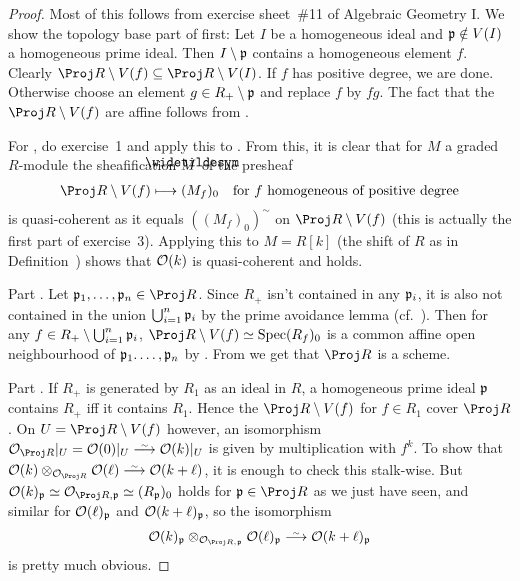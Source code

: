 \documentclass[a4paper,parskip=half,numbers=enddot, DIV=12]{scrreprt}
\begin{document}
\begin{proof}
	Most of this follows from exercise sheet~\#11 of Algebraic Geometry I. We show the topology base part of  first: Let $I$ be a homogeneous ideal and $\mathfrak{p}\notin V(I)$ a homogeneous prime ideal. Then $I\setminus \mathfrak{p}$ contains a homogeneous element $f$. Clearly $\Proj R\setminus V(f)\subseteq \Proj R\setminus V(I)$. If $f$ has positive degree, we are done. Otherwise choose an element $g\in R_+\setminus \mathfrak{p}$ and replace $f$ by $fg$. The fact that the $\Proj R\setminus V(f)$ are affine follows from .
	
	For , do exercise~1 and apply this to . From this, it is clear that for $M$ a graded $R$-module the sheafification $\snake{M}$ of the presheaf 
	\begin{align*}
		\Proj R\setminus V(f)\longmapsto (M_f)_0\quad\text{for }f\text{ homogeneous of positive degree}
	\end{align*}
	is quasi-coherent as it equals $((M_f)_0)^\sim$ on $\Proj R\setminus V(f)$ (this is actually the first part of exercise~3). Applying this to $M=R[k]$ (the shift of $R$ as in Definition~) shows that $\mathcal{O}(k)$ is quasi-coherent and  holds.
	
	Part . Let $\pp_1,\ldots,\pp_n\in\Proj R$. Since $R_+$ isn't contained in any $\mathfrak{p}_i$, it is also not contained in the union $\bigcup_{i=1}^n\mathfrak{p}_i$ by the prime avoidance lemma (cf.\ \cite[Lemma~2.5.1]{alg1}). Then for any $f\in R_+\setminus \bigcup_{i=1}^n\mathfrak{p}_i$, $\Proj R\setminus V(f)\simeq \Spec (R_f)_0$ is a common affine open neighbourhood of $\mathfrak{p}_1.\ldots,\mathfrak{p}_n$ by . From \cite[Fact~1.5.9]{alggeo1} we get that $\Proj R$ is a scheme.
	
	Part . If $R_+$ is generated by $R_1$ as an ideal in $R$, a homogeneous prime ideal $\mathfrak{p}$ contains $R_+$ iff it contains $R_1$. Hence the $\Proj R\setminus V(f)$ for $f\in R_1$ cover $\Proj R$. On $U=\Proj R\setminus V(f)$ however, an isomorphism $\Oo_{\Proj R}|_U=\Oo(0)|_U\isomorphism \Oo(k)|_U$ is given by multiplication with $f^k$. To show that $\Oo(k)\otimes_{\Oo_{\Proj R}}\Oo(\ell)\isomorphism\Oo(k+\ell)$, it is enough to check this stalk-wise. But $\Oo(k)_\pp\simeq \Oo_{\Proj R,\pp}\simeq (R_\pp)_0$ holds for $\pp\in\Proj R$ as we just have seen, and similar for $\mathcal{O}(\ell)_{\mathfrak{p}}$ and $\mathcal{O}(k+\ell)_{\mathfrak{p}}$, so the isomorphism
	\begin{align*}
		\Oo(k)_\pp\otimes_{\Oo_{\Proj R,\pp}}\Oo(\ell)_\pp\isomorphism \Oo(k+\ell)_\pp
	\end{align*}
	is pretty much obvious.
	

\end{proof}
\end{document}
